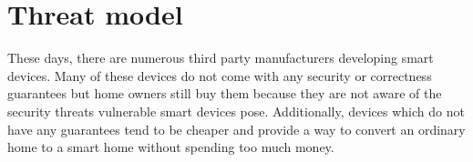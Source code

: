 \documentclass{article}
\begin{document}


\section{Threat model}
\label{sec:threat}
These days, there are numerous third party manufacturers developing smart devices. Many of these devices do not come with any security or correctness guarantees but home owners still buy them because they are not aware of the security threats vulnerable smart devices pose. Additionally, devices which do not have any guarantees tend to be cheaper and provide a way to convert an ordinary home to a smart home without spending too much money. \\
\end{document}
